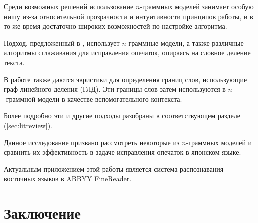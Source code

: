 \documentclass[14pt,russian]{extreport}
\theoremstyle{definition}
\begin{document}
Среди возможных решений использование $n$-граммных моделей занимает особую нишу из-за относительной прозрачности и интуитивности принципов работы, и в то же время достаточно широких возможностей по настройке алгоритма.

Подход, предложенный в \cite{nagata:shape}, использует $n$-граммные модели, а также различные алгоритмы сглаживания для исправления опечаток, опираясь на словное деление текста. 

В работе \cite{nagata:context} также даются эвристики для определения границ слов, использующие граф линейного деления (ГЛД). Эти границы слов затем используются в $n$-граммной модели в качестве вспомогательного контекста.

Более подробно эти и другие подходы разобраны в соответствующем разделе (\ref{sec:litreview}).

Данное исследование призвано рассмотреть некоторые из $n$-граммных моделей и сравнить их эффективность в задаче исправления опечаток в японском языке.

Актуальным приложением этой работы является система распознавания восточных языков в ABBYY FineReader.

\newpage


\newpage


\newpage


\newpage


\newpage


\newpage


\newpage
\section{ Заключение }\label{sec:epilogue}

\newpage

\end{document}
